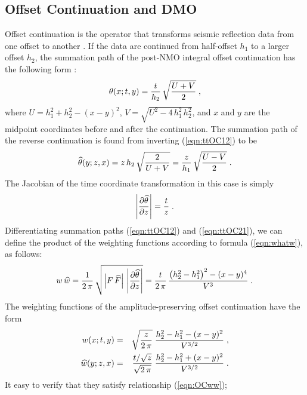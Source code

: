\subsection{Offset Continuation and DMO}
Offset continuation is the operator that transforms seismic reflection
data from one offset to another
\cite[]{GPR30-06-08130828,GPR30-06-08290849}. If the data are continued
from half-offset $h_1$ to a larger offset $h_2$, the summation path of
the post-NMO integral offset continuation has the following form
\cite[]{Biondi.sep.80.125,stovas,Fomel.sepphd.107}:
\begin{equation}
\theta(x;t,y)  =  {t \over h_2}\,\sqrt{{U+V} \over 2}\;,
\label{eqn:ttOC12}
\end{equation}
where $U = h_1^2 + h_2^2 - (x - y)^2$, $V = \sqrt{U^2 -
4\,h_1^2\,h_2^2}$, and $x$ and $y$ are the midpoint coordinates before and
after the continuation. The summation path of the reverse continuation
is found from inverting (\ref{eqn:ttOC12}) to be
\begin{equation}
\widehat{\theta}(y;z,x)  =  {z \,h_2}\,\sqrt{2 \over {U+V}} = 
{z \over h_1}\,\sqrt{{U-V} \over 2}\;.
\label{eqn:ttOC21}
\end{equation}
The Jacobian of the time coordinate transformation in this case is simply
\begin{equation}
\left|\partial \widehat{\theta} \over \partial z\right| = {t \over z}\;.
\label{eqn:OCj}
\end{equation}
Differentiating summation paths (\ref{eqn:ttOC12}) and (\ref{eqn:ttOC21}), we
can define the product of the weighting functions according to formula
(\ref{eqn:whatw}), as follows:
\begin{equation}
w\,\widehat{w}={1\over{2\,\pi}} \, 
{\sqrt{\left|F\,\widehat{F}\right|\,
\left|\partial \widehat{\theta} \over \partial z\right|}} =
{t\over{2\,\pi}} \,{{\left(h_2^2-h_1^2\right)^2 - (x-y)^4} \over 
V^3}\;.
\label{eqn:OCww}
\end{equation}
The weighting functions of the amplitude-preserving offset
continuation have the form \cite[]{Fomel.sepphd.107}
\begin{eqnarray}
w(x;t,y) & = & \sqrt{z \over {2\,\pi}}\;
{{h_2^2-h_1^2-(x-y)^2} \over {V^{3/2}}}\;, 
\label{eqn:wOC12} \\
\widehat{w}(y;z,x) & = & {{t/\sqrt{z}} \over \sqrt{2\,\pi}}\;
{{h_2^2-h_1^2 + (x-y)^2} \over {V^{3/2}}}\;. 
\label{eqn:wOC21} 
\end{eqnarray}
It easy to verify that they satisfy relationship (\ref{eqn:OCww});
